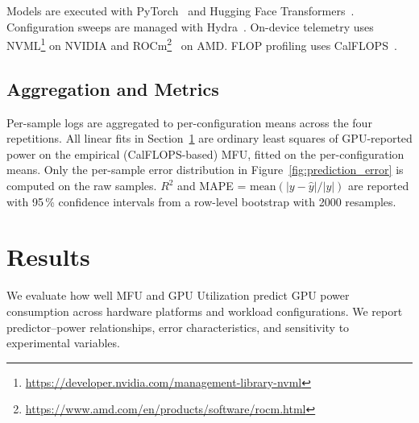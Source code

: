 \documentclass[10pt,conference,letterpaper]{IEEEtran}
\begin{document}
Models are executed with PyTorch~\cite{paszke2019pytorch} and Hugging Face Transformers~\cite{wolf2019huggingface0s}.
Configuration sweeps are managed with Hydra~\cite{Yadan2019Hydra}.
On-device telemetry uses NVML\footnote{\url{https://developer.nvidia.com/management-library-nvml}} on NVIDIA and ROCm\footnote{\url{https://www.amd.com/en/products/software/rocm.html}}~\cite{weakley-2025} on AMD.
FLOP profiling uses CalFLOPS~\cite{calflops}.


\subsection{Aggregation and Metrics}\label{sec:analysis}
Per-sample logs are aggregated to per-configuration means across the four repetitions.
All linear fits in Section~\ref{results} are ordinary least squares of GPU-reported power on the empirical (CalFLOPS-based) MFU, fitted on the per-configuration means.
Only the per-sample error distribution in Figure~\ref{fig:prediction_error} is computed on the raw samples.
$R^2$ and MAPE = $\text{mean}(|y-\hat{y}|/|y|)$ are reported with 95\,\% confidence intervals from a row-level bootstrap with 2000 resamples.


\section{Results}\label{results}
We evaluate how well MFU and GPU Utilization predict GPU power consumption across hardware platforms and workload configurations.
We report predictor--power relationships, error characteristics, and sensitivity to experimental variables.
\end{document}
